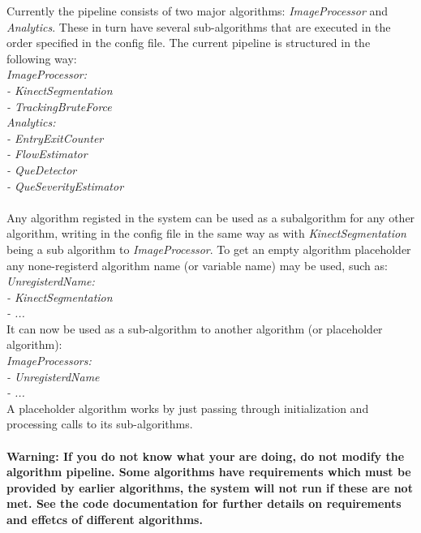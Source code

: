 \newpage
Currently the pipeline consists of two major algorithms: \textit{ImageProcessor} and \textit{Analytics}. These in turn have several sub-algorithms that are executed in the order specified in the config file. The current pipeline is structured in the following way: \\
\hspace*{0.5cm}\textit{ImageProcessor:\\
\hspace*{1cm}- KinectSegmentation\\
\hspace*{1cm}- TrackingBruteForce}\\
\hspace*{0.5cm}\textit{Analytics:\\
\hspace*{1cm}- EntryExitCounter\\
\hspace*{1cm}- FlowEstimator\\
\hspace*{1cm}- QueDetector\\
\hspace*{1cm}- QueSeverityEstimator}\\\\
Any algorithm registed in the system can be used as a subalgorithm for any other algorithm, writing in the config file in the same way as with \textit{KinectSegmentation} being a sub algorithm to \textit{ImageProcessor}. To get an empty algorithm placeholder any none-registerd algorithm name (or variable name) may be used, such as:\\
\hspace*{0.5cm}\textit{UnregisterdName:\\
\hspace*{1cm}- KinectSegmentation\\
\hspace*{1cm}- ...}\\
It can now be used as a sub-algorithm to another algorithm (or placeholder algorithm):\\
\hspace*{0.5cm}\textit{ImageProcessors:\\
\hspace*{1cm}- UnregisterdName\\
\hspace*{1cm}- ...}\\
A placeholder algorithm works by just passing through initialization and processing calls to its sub-algorithms.\\\\
\textbf{Warning: If you do not know what your are doing, do not modify the algorithm pipeline. Some algorithms have requirements which must be provided by earlier algorithms, the system will not run if these are not met. See the code documentation for further details on requirements and effetcs of different algorithms.}

